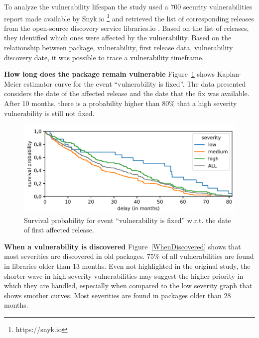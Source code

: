 \documentclass[pdf,bookmarks,colorlinks=true]{IEEEtran}
\begin{document}
To analyze the vulnerability lifespan the study \cite{Decan2018} used a 700 security vulnerabilities report made available by Snyk.io \footnote{https://snyk.io} and retrieved the list of corresponding releases from the open-source discovery service libraries.io \cite{Nesbitt2017}. Based on the list of releases, they identified which ones were affected by the vulnerability.
Based on the relationship between package, vulnerability, first release data, vulnerability discovery date, it was possible to trace a vulnerability timeframe.

\textbf{How long does the package remain vulnerable}
Figure~\ref{RemainsVulnerable} shows Kaplan-Meier estimator  curve \cite{Kaplan1958} for the event “vulnerability is fixed”. The data presented considers the date of the affected release and the date that the fix was available. After 10 months, there is a probability higher than 80\% that a high severity vulnerability is still not fixed.

\begin{figure}[h]
	\centering
	\includegraphics[scale=0.70]{RemainsVulnerable.png}
	\caption{Survival probability for event “vulnerability is fixed” w.r.t. the date of first affected release.}
	\label{RemainsVulnerable}
\end{figure}



\textbf{When a vulnerability is discovered}
Figure~\ref{WhenDiscovered} shows that most severities are discovered in old packages. 75\% of all vulnerabilities are found in libraries older than 13 months. Even not highlighted in the original study, the shorter wave in high severity vulnerabilities may suggest the higher priority in which they are handled, especially when compared to the low severity graph that shows smother curves. Most severities are found in packages older than 28 months.
\end{document}
